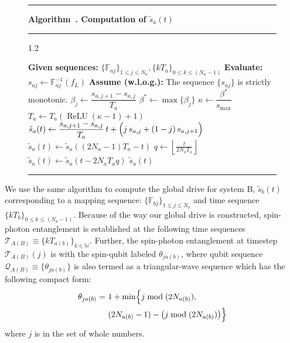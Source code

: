 \documentclass[%
 reprint,
 superscriptaddress,
 amsmath,amssymb,
 aps,
 prx,
]{revtex4-2}
\newcounter{algorithm} %
\newcommand{\algcaption}[1]{%
  \refstepcounter{algorithm}%
  \noindent\rule{\textwidth}{0.8pt}
  \textbf{Algorithm~\thealgorithm. #1}
  \noindent\rule{\textwidth}{0.8pt}
}
\begin{document}
\begin{figure}[t]
\algcaption{Computation of \( \tilde{s}_{a}(t) \)}
\begin{spacing}{1.2}
\label{alg:1}
\begin{algorithmic}[1]
    \State \textbf{Given sequences:} \( \{\mathbb{F}_{aj}\}_{1\le j\le N_{a}}, \{kT_{a}\}_{0\le k\le (N_{a}-1)} \)
    \State \textbf{Evaluate:} \( s_{aj} \gets \mathbb{F}_{aj}^{-1}(f_L) \)
    \State \textbf{Assume (w.l.o.g.):} The sequence \(\{ s_{aj} \}\) is strictly monotonic.
    \State \(\beta_j \gets \dfrac{s_{a,j+1} - s_{a,j}}{T_a}\)
    \State \(\beta^* \gets \max\{\beta_j\}\)
    \State \(\kappa \gets \dfrac{\beta^*}{s_{\max}}\)
    \State \( T_a \gets {T_a}(\operatorname{ReLU}(\kappa-1)+1) \)
            \State \( \tilde{s}_{a}(t) \gets \dfrac{s_{a,j+1} - s_{a,j}}{T_a}\, t + \Bigl(j\, s_{a,j} + (1-j)\, s_{a,j+1}\Bigr)\)
        \EndIf
    \EndFor
        \State \( \tilde{s}_{a}(t) \gets \tilde{s}_{a}((2N_{a}-1)T_{a}-t) \)
    \EndFor
        \State \( q \gets \left\lfloor \frac{t}{2N_{a}T_{a}} \right\rfloor\ \)
        \State \( \tilde{s}_{a}(t) \gets \tilde{s}_{a}(t - 2N_{a}T_{a}q) \)
    \EndFor
    \State \Return \( \tilde{s}_{a}(t)  \) 
\end{algorithmic}
\end{spacing}
\noindent\rule{\textwidth}{0.8pt}
\end{figure}

We use the same algorithm to compute the global drive for system B, $\tilde{s}_{b}(t)$ corresponding to a mapping sequence: $\{\mathbb{F}_{bj}\}_{1\le j\le N_{b}}$ and time sequence $\{kT_{b}\}_{0\le k\le (N_{b}-1)}$. Because of the way our global drive is constructed, spin-photon entanglement is established at the following time sequences $\mathcal{T}_{A(B)} \equiv \{kT_{a(b)}\}_{k\in\mathbb{W}}$. Further, the spin-photon entanglement at timestep $\mathcal{T}_{A(B)}(j)$ is with the spin-qubit labeled $\theta_{ja(b)}$, where qubit sequence $\mathcal{Q}_{A(B)} \equiv \{\theta_{ja(b)}\}$ is also termed as a triangular-wave sequence which has the following compact form:
\begin{equation}
\begin{aligned}
    \theta_{ja(b)} =\ & 1 + \min\Bigl\{ j \bmod (2N_{a(b)}), \\
    & (2N_{a(b)} - 1) - \bigl(j \bmod (2N_{a(b)})\bigr) \Bigr\}
\end{aligned}
\label{eq:triangularwave}
\end{equation}
%
where $j$ is in the set of whole numbers.
\end{document}
